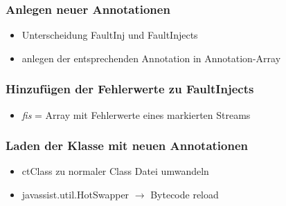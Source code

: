 \begin{frame}[fragile]
	\frametitle{Anlegen neuer Annotationen}
	
	\begin{itemize}
		\item Unterscheidung FaultInj und FaultInjects
		\item anlegen der entsprechenden Annotation in Annotation-Array
	\end{itemize}

	
\end{frame}

\begin{frame}[fragile]
	\frametitle{Hinzufügen der Fehlerwerte zu FaultInjects}
	
	\begin{itemize}
		\item \textit{fis} = Array mit Fehlerwerte eines markierten Streams
	\end{itemize}

	
\end{frame}

\begin{frame}[fragile]
	\frametitle{Laden der Klasse mit neuen Annotationen}
	
	\begin{itemize}
		\item ctClass zu normaler Class Datei umwandeln
		\item javassist.util.HotSwapper $\rightarrow$ Bytecode reload
	\end{itemize}

	
\end{frame}



